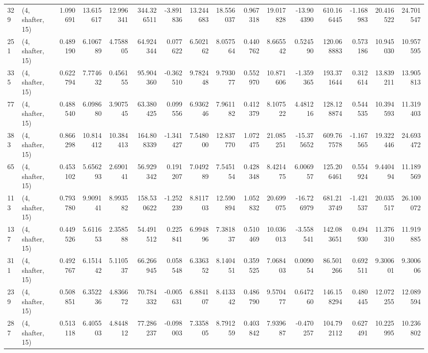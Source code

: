 \begin{tabular}{llrrrrrrrrrrrrrr}
329 &  (4, shafter, 15) &   1.090691 &  13.615617 &  12.996341 &   344.326511 &  -3.891836 &  13.244683 &  18.556037 &  0.967318 &  19.017828 & -13.904390 &   610.166445 &  -1.168983 &  20.416522 &  24.701547 \\
251 &  (4, shafter, 15) &   0.489190 &   6.106789 &   4.758805 &    64.924344 &   0.077622 &   6.502162 &   8.057564 &  0.440762 &   8.665542 &   0.524590 &   120.068883 &   0.573186 &  10.945030 &  10.957595 \\
335 &  (4, shafter, 15) &   0.622794 &   7.774632 &   0.456155 &    95.904360 &  -0.362510 &   9.782448 &   9.793077 &  0.552970 &  10.871606 &  -1.359365 &   193.371644 &   0.312614 &  13.839211 &  13.905813 \\
77  &  (4, shafter, 15) &   0.488540 &   6.098680 &   3.907545 &    63.380425 &   0.099556 &   6.936246 &   7.961182 &  0.412379 &   8.107522 &   4.481216 &   128.128874 &   0.544535 &  10.394593 &  11.319403 \\
383 &  (4, shafter, 15) &   0.866298 &  10.814412 &  10.384413 &   164.808339 &  -1.341427 &   7.548000 &  12.837770 &  1.072475 &  21.085251 & -15.375652 &   609.767578 &  -1.167565 &  19.322446 &  24.693472 \\
65  &  (4, shafter, 15) &   0.453102 &   5.656293 &   2.690141 &    56.929342 &   0.191207 &   7.049289 &   7.545154 &  0.428348 &   8.421475 &   6.006957 &   125.206461 &   0.554924 &   9.440494 &  11.189569 \\
113 &  (4, shafter, 15) &   0.793780 &   9.909141 &   8.993582 &   158.530622 &  -1.252239 &   8.811703 &  12.590894 &  1.052832 &  20.699075 & -16.726979 &   681.213749 &  -1.421537 &  20.035517 &  26.100072 \\
137 &  (4, shafter, 15) &   0.449526 &   5.611653 &   2.358588 &    54.491512 &   0.225841 &   6.994896 &   7.381837 &  0.510469 &  10.036013 &  -3.558541 &   142.083651 &   0.494930 &  11.376310 &  11.919885 \\
311 &  (4, shafter, 15) &   0.492767 &   6.151442 &   5.110537 &    66.266945 &   0.058548 &   6.336352 &   8.140451 &  0.359525 &   7.068403 &   0.009054 &    86.501266 &   0.692511 &   9.300601 &   9.300606 \\
239 &  (4, shafter, 15) &   0.508851 &   6.352236 &   4.836672 &    70.784332 &  -0.005631 &   6.884107 &   8.413342 &  0.486790 &   9.570477 &   0.647260 &   146.158294 &   0.480445 &  12.072255 &  12.089594 \\
287 &  (4, shafter, 15) &   0.513118 &   6.405503 &   4.844812 &    77.286237 &  -0.098003 &   7.335805 &   8.791259 &  0.403842 &   7.939687 &  -0.470257 &   104.792112 &   0.627491 &  10.225995 &  10.236802 \\

\end{tabular}
